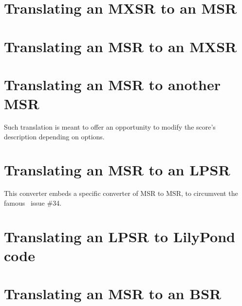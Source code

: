 \section{Translating an MXSR to an MSR}


\section{Translating an MSR to an MXSR}


\section{Translating an MSR to another MSR}

Such translation is meant to offer an opportunity to modify the score's description depending on options.


\section{Translating an MSR to an LPSR}

This converter embeds a specific converter of MSR to MSR, to circumvent the famous \lily\ issue \#34.


\section{Translating an LPSR to LilyPond code}


\section{Translating an MSR to an BSR}

